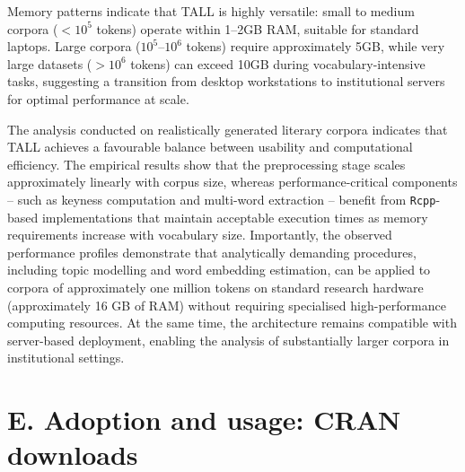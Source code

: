 \documentclass[8pt,a4paper]{article}
\begin{document}
Memory patterns indicate that TALL is highly versatile: small to medium corpora ($<10^5$ tokens) operate within 1--2GB RAM, suitable for standard laptops. Large corpora ($10^5$--$10^6$ tokens) require approximately 5GB, while very large datasets ($>10^6$ tokens) can exceed 10GB during vocabulary-intensive tasks, suggesting a transition from desktop workstations to institutional servers for optimal performance at scale.

The analysis conducted on realistically generated literary corpora indicates that TALL achieves a favourable balance between usability and computational efficiency. The empirical results show that the preprocessing stage scales approximately linearly with corpus size, whereas performance-critical components -- such as keyness computation and multi-word extraction -- benefit from \texttt{Rcpp}-based implementations that maintain acceptable execution times as memory requirements increase with vocabulary size. Importantly, the observed performance profiles demonstrate that analytically demanding procedures, including topic modelling and word embedding estimation, can be applied to corpora of approximately one million tokens on standard research hardware (approximately 16 GB of RAM) without requiring specialised high-performance computing resources. At the same time, the architecture remains compatible with server-based deployment, enabling the analysis of substantially larger corpora in institutional settings.


\section*{E. \quad Adoption and usage: CRAN downloads}
\end{document}
